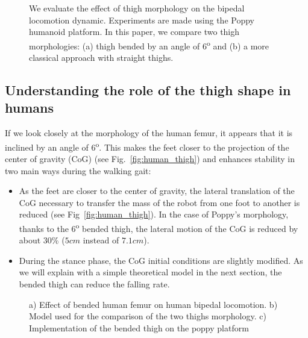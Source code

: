 

\begin{figure}[!t]
\centering
    \hfil
    \caption{We evaluate the effect of thigh morphology on the bipedal locomotion dynamic.
    Experiments are made using the Poppy humanoid platform.
    In this paper, we compare two thigh morphologies: (a) thigh bended by an angle of 6\textsuperscript{o} and (b) a more classical approach with straight thighs.}
    \label{fig:poppy_compared}
\end{figure}


\subsection{Understanding the role of the thigh shape in humans} %

If we look closely at the morphology of the human femur, it appears that it is inclined by an angle of 6\textsuperscript{o}. This makes the feet closer to the projection of the center of gravity (CoG) (see Fig.~\ref{fig:human_thigh}) and enhances stability  in  two main ways  during the walking gait:

\begin{itemize}
    \item As the feet are closer to the center of gravity, the lateral translation of the CoG necessary to transfer the mass of the robot from one foot to another is reduced (see Fig~\ref{fig:human_thigh}). In the case of Poppy's morphology, thanks to the $6$\textsuperscript{o} bended thigh, the lateral motion of the CoG is reduced by about 30\% ($ 5 cm$ instead of $7.1 cm$).
    \item During the stance phase, the CoG initial conditions are slightly modified. As we will explain with a simple theoretical model in the next section, the bended thigh can reduce the falling rate.
\end{itemize}


\begin{figure}
\centering
    \hfil
    \hfil
    \caption{ a) Effect of bended human femur on human bipedal locomotion.
    b) Model used for the comparison of the two thighs morphology.
    c) Implementation of the bended thigh on the poppy platform}
    \label{fig:poppy_thigh}
\end{figure}

